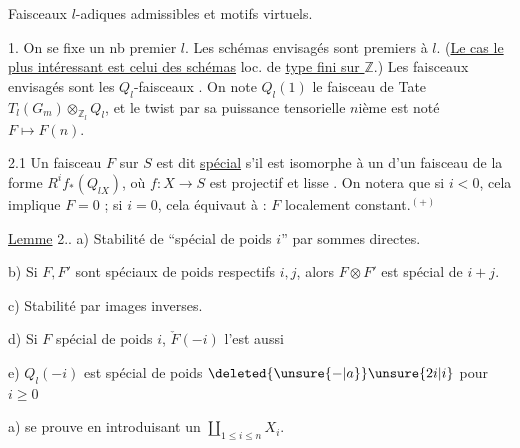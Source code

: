 Faisceaux $l$-adiques admissibles et motifs virtuels.


1. On se fixe un nb premier $l$. Les schémas envisagés sont premiers à $l$. (\uline{Le cas le plus intéressant est celui des schémas} loc. de \uline{type fini sur $\mathbb Z$}.) Les faisceaux envisagés sont les $Q_l$-faisceaux . On note $Q_l(1)$ le faisceau de Tate $T_l(G_m)\otimes_{\mathbb Z_l}Q_l$, et le twist par sa puissance tensorielle $n$ième est noté $F\longmapsto F(n)$.


2.1 Un faisceau $F$ sur $S$ est dit \uline{spécial}  s'il est isomorphe à un   d'un  faisceau  de la forme $R^i f_*(Q_{lX})$, où $f:X\to S$ est projectif et lisse . \unsure{(|[}On notera que si $i<0$, cela implique $F=0$ ; si $i=0$, cela  équivaut à : $F$ localement constant.$^{(+)}$


\uline{Lemme} 2.. \quad a) Stabilité de \textquotedblleft spécial de poids $i$\textquotedblright{} par  sommes directes.

b) Si $F,F'$ sont spéciaux de poids respectifs $i,j$, alors $F\otimes F'$ est spécial de $i+j$.

c) Stabilité par images inverses.

d) Si $F$ spécial de poids $i$, $\check F(-i)$ l'est aussi

e) $Q_l(-i)$ est spécial de poids $\deleted{\unsure{-|a}}\unsure{2i|i}$ pour $i\ge0$

a) se prouve en introduisant un $\coprod_{1\le i\le n}X_i$.

